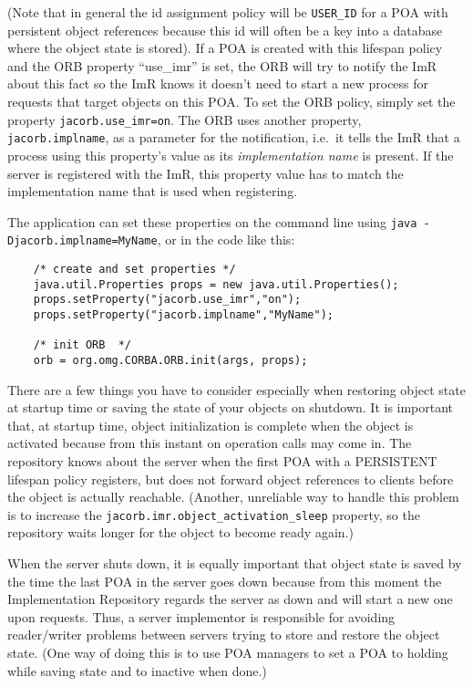 (Note that in general the  id assignment policy will be {\tt USER\_ID}
for a POA with persistent object references because this id will often
be a key into  a database where the object state is  stored). If a POA
is created with this lifespan policy and the ORB property ``use\_imr''
is set, the ORB will try to  notify the ImR about this fact so the ImR
knows it doesn't need to start  a new process for requests that target
objects on this  POA.  To set the ORB policy,  simply set the property
{\tt  jacorb.use\_imr=on}.   The   ORB  uses  another  property,  {\tt
jacorb.implname}, as  a parameter for the  notification, i.e.~it tells
the  ImR  that a  process  using this  property's  value  as its  {\em
implementation name} is present. If  the server is registered with the
ImR, this property value has  to match the implementation name that is
used when registering.

The application  can set  these properties on  the command  line using
{\tt java -Djacorb.implname=MyName}, or in the code like this:

\small{
\begin{verbatim}
    /* create and set properties */
    java.util.Properties props = new java.util.Properties();
    props.setProperty("jacorb.use_imr","on");
    props.setProperty("jacorb.implname","MyName");

    /* init ORB  */
    orb = org.omg.CORBA.ORB.init(args, props);
\end{verbatim}
}

There are a few things  you have to consider especially when restoring
object state  at startup time or  saving the state of  your objects on
shutdown. It is important that, at startup time, object initialization
is complete when the object  is activated because from this instant on
operation calls  may come  in. The repository  knows about  the server
when the  first POA with  a PERSISTENT lifespan policy  registers, but
does not  forward object  references to clients  before the  object is
actually reachable. (Another, unreliable way to handle this problem is
to  increase the {\tt  jacorb.imr.object\_activation\_sleep} property,
so the repository waits longer for the object to become ready again.)

When the server shuts down,  it is equally important that object state
is saved by the time the last POA in the server goes down because from
this moment  the Implementation Repository regards the  server as down
and will start a new one upon requests.  Thus, a server implementor is
responsible for avoiding reader/writer problems between servers trying
to store and  restore the object state.  (One way of  doing this is to
use POA  managers to set  a POA to  holding while saving state  and to
inactive when done.)

